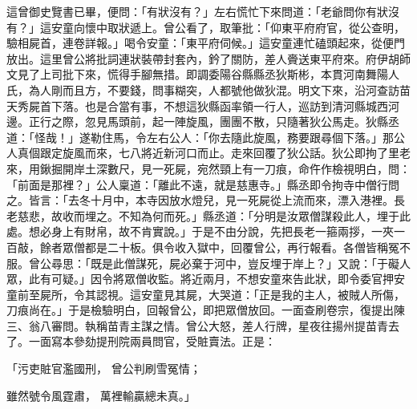 這曾御史覽書已畢，便問：「有狀沒有？」左右慌忙下來問道：「老爺問你有狀沒有？」這安童向懷中取狀遞上。曾公看了，取筆批：「仰東平府府官，從公查明，驗相屍首，連卷詳報。」喝令安童：「東平府伺候。」這安童連忙磕頭起來，從便門放出。這里曾公將批詞連狀裝帶封套內，鈐了關防，差人賫送東平府來。府伊胡師文見了上司批下來，慌得手腳無措。即調委陽谷縣縣丞狄斯彬，本貫河南舞陽人氏，為人剛而且方，不要錢，問事糊突，人都號他做狄混。明文下來，沿河查訪苗天秀屍首下落。也是合當有事，不想這狄縣函率領一行人，巡訪到清河縣城西河邊。正行之際，忽見馬頭前，起一陣旋風，團團不散，只隨著狄公馬走。狄縣丞道：「怪哉！」遂勒住馬，令左右公人：「你去隨此旋風，務要跟尋個下落。」那公人真個跟定旋風而來，七八將近新河口而止。走來回覆了狄公話。狄公即拘了里老來，用鍬掘開岸土深數尺，見一死屍，宛然頸上有一刀痕，命仵作檢視明白，問：「前面是那裡？」公人稟道：「離此不遠，就是慈惠寺。」縣丞即令拘寺中僧行問之。皆言：「去冬十月中，本寺因放水燈兒，見一死屍從上流而來，漂入港裡。長老慈悲，故收而埋之。不知為何而死。」縣丞道：「分明是汝眾僧謀殺此人，埋于此處。想必身上有財帛，故不肯實說。」于是不由分說，先把長老一箍兩拶，一夾一百敲，餘者眾僧都是二十板。俱令收入獄中，回覆曾公，再行報看。各僧皆稱冤不服。曾公尋思：「既是此僧謀死，屍必棄于河中，豈反埋于岸上？」又說：「于礙人眾，此有可疑。」因令將眾僧收監。將近兩月，不想安童來告此狀，即令委官押安童前至屍所，令其認視。這安童見其屍，大哭道：「正是我的主人，被賊人所傷，刀痕尚在。」于是檢驗明白，回報曾公，即把眾僧放回。一面查刷卷宗，復提出陳三、翁八審問。執稱苗青主謀之情。曾公大怒，差人行牌，星夜往揚州提苗青去了。一面寫本參劾提刑院兩員問官，受賍賣法。正是：

「污吏賍官濫國刑，  曾公判刷雪冤情；

雖然號令風霆肅，  萬裡輸贏總未真。」

